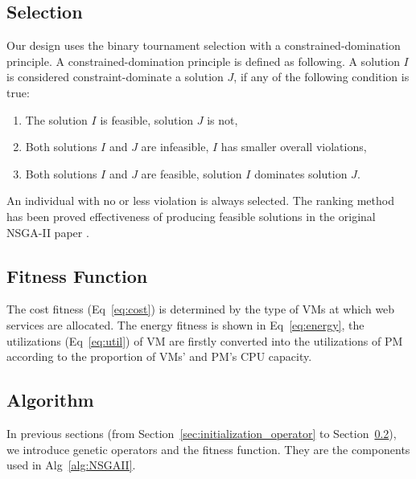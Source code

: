 \subsection{Selection}
Our design uses the binary tournament selection with a constrained-domination principle. A constrained-domination principle is defined as following. A solution $I$ is considered constraint-dominate a solution $J$, if any of the following condition is true:
\begin{enumerate}
  \item The solution $I$ is feasible, solution $J$ is not,
  \item Both solutions  $I$ and $J$ are infeasible, $I$ has smaller overall
violations,
  \item Both solutions $I$ and $J$ are feasible, solution $I$ dominates solution $J$.
\end{enumerate}

An individual with no or less violation is always selected. The ranking method has been proved effectiveness of producing feasible solutions in the original NSGA-II paper \cite{nsgaii}.

\subsection{Fitness Function}
\label{sec:fitness_function}
The cost fitness (Eq~\ref{eq:cost}) is determined by the type of VMs at which web services are allocated. 
The energy fitness is shown in Eq~\ref{eq:energy}, the utilizations (Eq~\ref{eq:util}) of VM are firstly converted into the utilizations of PM according to the proportion of VMs’ and PM’s CPU capacity.

\subsection{Algorithm}
\label{sec:pseudocode}
In previous sections (from Section~\ref{sec:initialization_operator} to Section~\ref{sec:fitness_function}), we introduce genetic operators and the fitness function. They are the components used in Alg~\ref{alg:NSGAII}.

